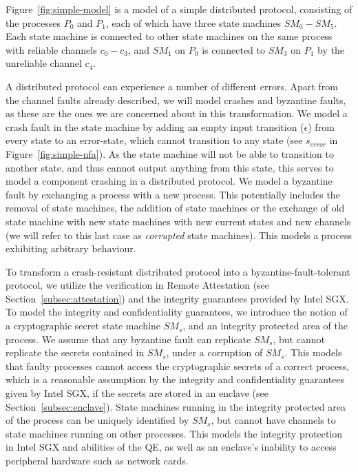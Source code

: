 \documentclass{article}
\begin{document}
	Figure~\ref{fig:simple-model} is a model of a simple distributed protocol, consisting of the processes $P_0$ and $P_1$, each of which have three state machines $SM_0 - SM_5$.
	Each state machine is connected to other state machines on the same process with reliable channels $c_0-c_3$, and $SM_1$ on $P_0$ is connected to $SM_3$ on $P_1$ by the unreliable channel $c_4$.

	A distributed protocol can experience a number of different errors.
	Apart from the channel faults already described, we will model crashes and byzantine faults, as these are the ones we are concerned about in this transformation.
	We model a crash fault in the state machine by adding an empty input transition ($\epsilon$) from every state to an error-state, which cannot transition to any state (see $s_{error}$ in Figure~\ref{fig:simple-nfa}).
	As the state machine will not be able to transition to another state, and thus cannot output anything from this state, this serves to model a component crashing in a distributed protocol.
	We model a byzantine fault by exchanging a process with a new process.
	This potentially includes the removal of state machines, the addition of state machines or the exchange of old state machine with new state machines with new current states and new channels (we will refer to this last case as \textit{corrupted} state machines).
	This models a process exhibiting arbitrary behaviour.

	To transform a crash-resistant distributed protocol into a byzantine-fault-tolerant protocol, we utilize the verification in Remote Attestation (see Section~\ref{subsec:attestation}) and the integrity guarantees provided by Intel SGX.
	To model the integrity and confidentiality guarantees, we introduce the notion of a cryptographic secret state machine $SM_{s}$, and an integrity protected area of the process.
	We assume that any byzantine fault can replicate $SM_{s}$, but cannot replicate the secrets contained in $SM_s$, under a corruption of $SM_s$.
	This models that faulty processes cannot access the cryptographic secrets of a correct process, which is a reasonable assumption by the integrity and confidentiality guarantees given by Intel SGX, if the secrets are stored in an enclave (see Section~\ref{subsec:enclave}).
	State machines running in the integrity protected area of the process can be uniquely identified by $SM_{s}$, but cannot have channels to state machines running on other processes.
	This models the integrity protection in Intel SGX and abilities of the QE, as well as an enclave's inability to access peripheral hardware such as network cards.
\end{document}
